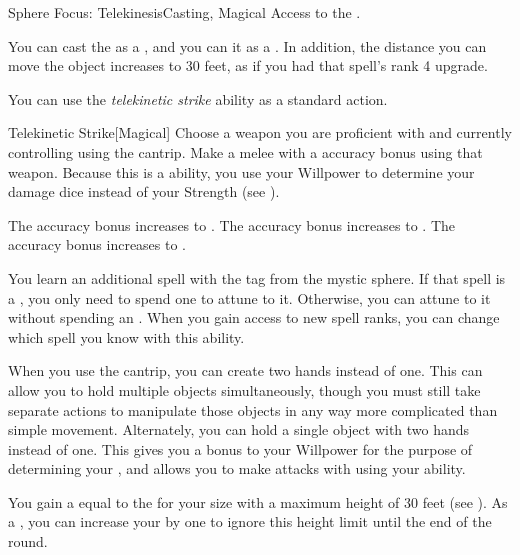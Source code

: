     \begin{feat}{Sphere Focus: Telekinesis}{Casting, Magical}
        \featpre Access to the  .

         You can cast the   as a , and you can  it as a .
        In addition, the distance you can move the object increases to 30 feet, as if you had that spell's rank 4 upgrade.

         You can use the \textit{telekinetic strike} ability as a standard action.
        \begin{activeability}{Telekinetic Strike}[Magical]
            \rankline
            Choose a weapon you are proficient with and currently controlling using the  cantrip.
            Make a melee  with a  accuracy bonus using that weapon.
            Because this is a  ability, you use your Willpower to determine your damage dice instead of your Strength (see ).

            \rankline
             The accuracy bonus increases to .
             The accuracy bonus increases to .
             The accuracy bonus increases to .
        \end{activeability}

         You learn an additional spell with the  tag from the  mystic sphere.
        If that spell is a , you only need to spend one  to attune to it.
        Otherwise, you can attune to it without spending an .
        When you gain access to new spell ranks, you can change which spell you know with this ability.

         When you use the  cantrip, you can create two hands instead of one.
        This can allow you to hold multiple objects simultaneously, though you must still take separate actions to manipulate those objects in any way more complicated than simple movement.
        Alternately, you can hold a single object with two hands instead of one.
        This gives you a  bonus to your Willpower for the purpose of determining your , and allows you to make attacks with  using your  ability.

         You gain a  equal to the  for your size with a maximum height of 30 feet (see ).
        As a , you can increase your  by one to ignore this height limit until the end of the round.
    \end{feat}

